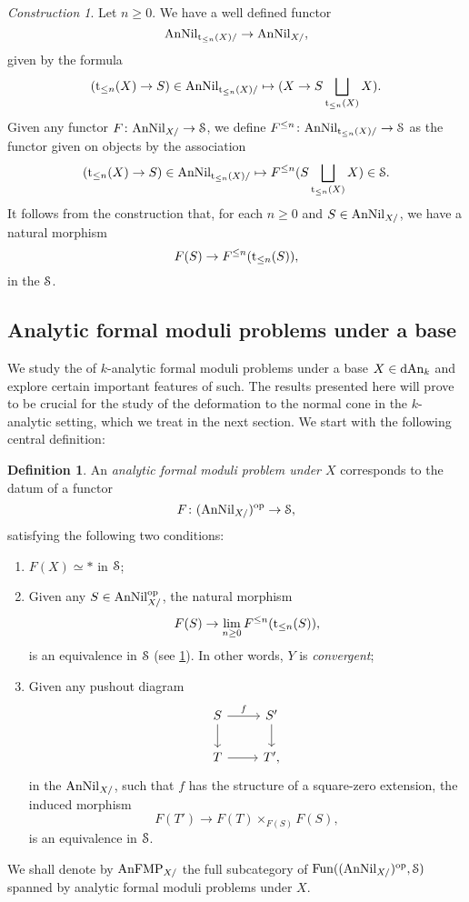 \documentclass[10pt,a4paper,reqno]{amsart} %
\theoremstyle{plain}
\theoremstyle{definition}
\newtheorem{defin}[thm]{Definition}
\theoremstyle{remark}
\numberwithin{equation}{section}
\newtheorem{construction}[thm]{Construction}
\begin{document}
\begin{construction} \label{const:leq_n_construction}
    Let $n \ge 0$. We have a well defined functor
        \[
            \mathrm{AnNil}_{\mathrm{t}_{\le n}(X)/ } \to \mathrm{AnNil}_{X/ },  
        \]
    given by the formula
        \[
            (\mathrm t_{\le n}(X) \to S) \in \mathrm{AnNil}_{\mathrm t_{\le n}(X)/ } \mapsto ( X \to S \bigsqcup_{\mathrm t_{\le n}(X)} X ).
        \]
    Given any functor $F \colon \mathrm{AnNil}_{X/ }\to \mathcal S$,
    we define $F^{\le n} \colon \mathrm{AnNil}_{\mathrm t_{\le n}(X)/ } \to \mathcal S$ as the functor given on objects by the association
        \[
            (\mathrm t_{\le n}(X) \to S) \in \mathrm{AnNil}_{\mathrm t_{\le n}(X)/ } \mapsto  F^{\le n}(S \bigsqcup_{\mathrm t_{\le n}(X)} X) \in \mathcal S.
        \]
    It follows from the construction that, for each $n \ge 0$ and $S \in \mathrm{AnNil}_{X/ }$, we have a natural morphism
        \[
            F(S) \to F^{\le n}(\mathrm t_{\le n}(S)),  
        \]
    in the \infcat $\mathcal S$.
\end{construction}


\subsection{Analytic formal moduli problems under a base} We study the \infcat of $k$-analytic formal moduli problems
under a base $X \in \mathrm{dAn}_k$ and explore certain important features of such. The
results presented here will prove to be crucial for the study of the deformation to the normal cone in the $k$-analytic
setting, which we treat in the next section.
We start with the following central definition:

\begin{defin} \label{defin:analytic_formal_moduli_problems_under}
    An \emph{analytic formal moduli problem under $X$} corresponds to the datum of a functor
        \[F \colon (\mathrm{AnNil}_{X/})^\mathrm{op} \to \mathcal S,\]
    satisfying the following two conditions:
    \begin{enumerate}
        \item $F(X) \simeq *$ in $\mathcal S$;
        \item Given any $S \in \mathrm{AnNil}^\mathrm{op}_{X/ }$, the natural morphism
            \[
                F(S) \to \lim_{n \ge 0} F^{\le n}(\mathrm t_{\le n}(S)),  
            \]
        is an equivalence in $\mathcal S$ (see \cref{const:leq_n_construction}). In other words, $Y$ is \emph{convergent};
        \item Given any pushout diagram
            \[\begin{tikzcd}
                S \ar{r}{f} \ar{d} & S' \ar{d} \\
                T \ar{r} & T',
            \end{tikzcd}\]
        in the \infcat $\mathrm{AnNil}_{X/}$, such that $f$ has the structure of a square-zero extension, the induced morphism
            \[F(T') \to F(T) \times_{F(S)}F(S),\]
        is an equivalence in $\mathcal S$.
    \end{enumerate}
    We shall denote by $\mathrm{AnFMP}_{X/}$ the full subcategory of $\operatorname{Fun}((\mathrm{AnNil}_{X/ })^\mathrm{op}, \mathcal S)$ spanned by analytic formal moduli problems
    under $X$.
\end{defin}
\end{document}
